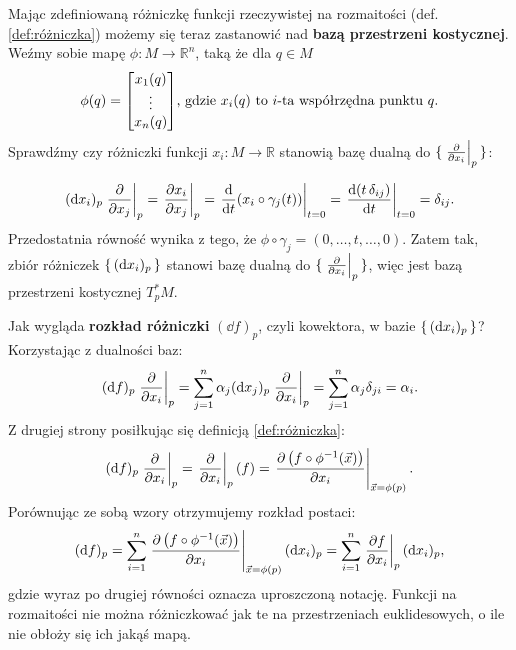 \documentclass{article}
\newcommand\R{\mathbb{R}}
\newcommand\suni{\sum_{i=1}^{n}}
\newcommand\sunj{\sum_{j=1}^{n}}
\newcommand\at[2]{\left.#1\right|_{#2}}
\begin{document}
Mając zdefiniowaną różniczkę funkcji rzeczywistej na rozmaitości (def. \ref{def:różniczka}) możemy się teraz zastanowić nad \textbf{bazą przestrzeni kostycznej}. Weźmy sobie mapę $\phi: M \to \R^n$, taką że dla $q\in M$
\[ \phi(q) = \mqty[x_1(q) \\ \vdots \\ x_n(q)]\text{, gdzie $x_i(q)$ to $i$-ta współrzędna punktu $q$.} \]
Sprawdźmy czy różniczki funkcji $x_i: M \to \R$ stanowią bazę dualną do $\set{\at{\partialderivative{x_i}}{p}}$:

\[ (\dd{x_i})_p \at{\partialderivative{x_j}}{p} = \at{\partialderivative{x_i}{x_j}}{p} = \at{\derivative{t}(x_i\circ\gamma_j(t))}{t=0} = \at{\derivative{(t\,\delta_{ij})}{t}}{t=0} = \delta_{ij}. \]
Przedostatnia równość wynika z tego, że $\phi\circ\gamma_j = (0,\ldots, t, \ldots, 0)$. Zatem tak, zbiór różniczek $\set{(\dd{x_i})_p}$ stanowi bazę dualną do $\set{\at{\partialderivative{x_i}}{p}}$, więc jest bazą przestrzeni kostycznej $T^*_pM$.  


Jak wygląda \textbf{rozkład różniczki} $(\dd{f})_p$, czyli kowektora, w bazie $\set{(\dd{x_i})_p}$? Korzystając z dualności baz:
\[
  (\dd{f})_p \at{\pdv{x_i}}{p} 
  = \sunj \alpha_j (\dd{x_j})_p \at{\partialderivative{x_i}}{p} = \sunj \alpha_j \delta_{ji} = \alpha_i. 
\]
Z drugiej strony posiłkując się definicją \ref{def:różniczka}:
\[ 
  (\dd{f})_p \at{\pdv{x_i}}{p} = \at{\pdv{x_i}}{p} (f) = \at{\pdv{\left( f\circ\phi^{-1}(\vec{x}) \right)}{x_{i}}}{\vec{x}=\phi(p)}.
\]
Porównując ze sobą wzory otrzymujemy rozkład postaci:
\begin{equation}\label{eq:rozkład_różniczki}
(\dd{f})_p = \suni \at{\pdv{\left( f\circ\phi^{-1}(\vec{x}) \right)}{x_{i}}}{\vec{x}=\phi(p)} (\dd{x_i})_p = \suni \at{\pdv{f}{x_i}}{p} (\dd{x_i})_p,
\end{equation}
gdzie wyraz po drugiej równości oznacza uproszczoną notację. Funkcji na rozmaitości nie można różniczkować jak te na przestrzeniach euklidesowych, o ile nie obłoży się ich jakąś mapą.
\end{document}
